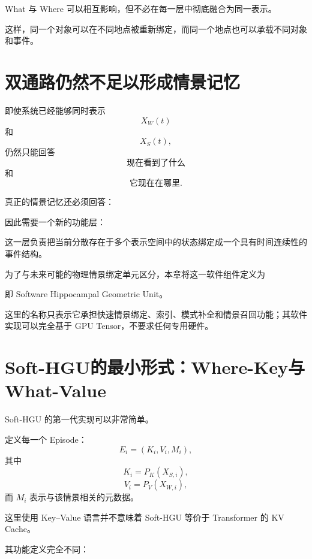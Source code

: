 What 与 Where 可以相互影响，但不必在每一层中彻底融合为同一表示。

这样，同一个对象可以在不同地点被重新绑定，而同一个地点也可以承载不同对象和事件。

\section{双通路仍然不足以形成情景记忆}

即使系统已经能够同时表示
\[
X_W(t)
\]
和
\[
X_S(t),
\]
仍然只能回答
\[
\text{现在看到了什么}
\]
和
\[
\text{它现在在哪里}.
\]

真正的情景记忆还必须回答：
\begin{statementbox}
\centering
{}
\end{statementbox}

因此需要一个新的功能层：
\begin{statementbox}
\centering
{}
\end{statementbox}

这一层负责把当前分散存在于多个表示空间中的状态绑定成一个具有时间连续性的事件结构。

为了与未来可能的物理情景绑定单元区分，本章将这一软件组件定义为
\begin{statementbox}
\centering
{}
\end{statementbox}
即 Software Hippocampal Geometric Unit。

这里的名称只表示它承担快速情景绑定、索引、模式补全和情景召回功能；其软件实现可以完全基于 GPU Tensor，不要求任何专用硬件。

\section{Soft-HGU的最小形式：Where-Key与What-Value}

Soft-HGU 的第一代实现可以非常简单。

定义每一个 Episode：
\[
E_i
=
(K_i,V_i,M_i),
\]
其中
\[
K_i
=
P_K(X_{S,i}),
\]
\[
V_i
=
P_V(X_{W,i}),
\]
而 $M_i$ 表示与该情景相关的元数据。

这里使用 Key--Value 语言并不意味着 Soft-HGU 等价于 Transformer 的 KV Cache。

其功能定义完全不同：

\begin{statementbox}
\centering
{}
\end{statementbox}
\begin{statementbox}
\centering
{}
\end{statementbox}

